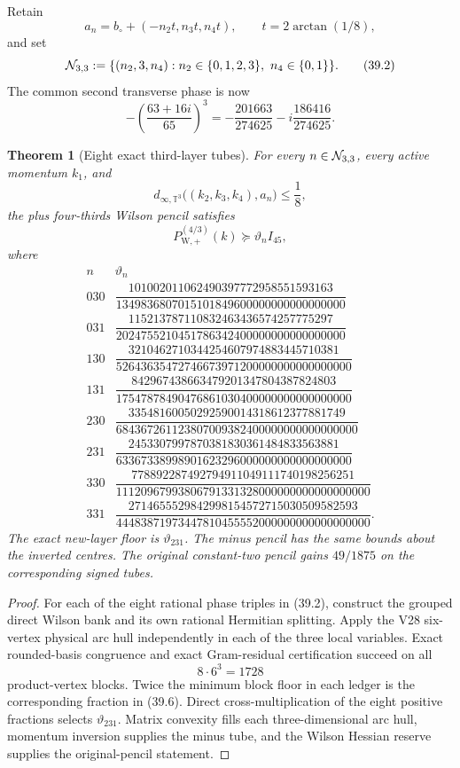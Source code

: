 \documentclass[11pt,oneside]{article}
\newtheorem{theorem}{Theorem}[section]
\theoremstyle{definition}
\theoremstyle{remark}
\begin{document}
Retain
\[
 a_n=b_\circ+(-n_2t,n_3t,n_4t),\qquad
 t=2\arctan(1/8),                                      \tag{39.1}
\]
and set
\[
 {\cal N}_{3,3}:=
 \{(n_2,3,n_4):n_2\in\{0,1,2,3\},\
                   n_4\in\{0,1\}\}.                   \tag{39.2}
\]
The common second transverse phase is now
\[
 -\left(\frac{63+16i}{65}\right)^3
 =-\frac{201663}{274625}
  -i\frac{186416}{274625}.                             \tag{39.3}
\]

\begin{theorem}[Eight exact third-layer tubes]
\label{thm:newv39-eight-charts}
For every \(n\in{\cal N}_{3,3}\), every active momentum \(k_1\), and
\[
 d_{\infty,\mathbb T^3}
 \bigl((k_2,k_3,k_4),a_n\bigr)\le\frac18,              \tag{39.4}
\]
the plus four-thirds Wilson pencil satisfies
\[
 P_{\mathrm W,+}^{(4/3)}(k)\succeq\vartheta_nI_{45},  \tag{39.5}
\]
where
\[
\begin{array}{c|c}
n&\vartheta_n\\ \hline
030&
\dfrac{101002011062490397772958551593163}
{1349836807015101849600000000000000000}\\[6pt]
031&
\dfrac{115213787110832463436574257775297}
{2024755210451786342400000000000000000}\\[6pt]
130&
\dfrac{3210462710344254607974883445710381}
{52643635472746673971200000000000000000}\\[6pt]
131&
\dfrac{842967438663479201347804387824803}
{17547878490476861030400000000000000000}\\[6pt]
230&
\dfrac{33548160050292590014318612377881749}
{684367261123807009382400000000000000000}\\[6pt]
231&
\dfrac{2453307997870381830361484833563881}
{63367338998901623296000000000000000000}\\[6pt]
330&
\dfrac{778892287492794911049111740198256251}
{11120967993806791331328000000000000000000}\\[6pt]
331&
\dfrac{2714655529842998154572715030509582593}
{44483871973447810455552000000000000000000}.
\end{array}                                             \tag{39.6}
\]
The exact new-layer floor is \(\vartheta_{231}\).  The minus pencil
has the same bounds about the inverted centres.  The original
constant-two pencil gains \(49/1875\) on the corresponding signed
tubes.
\end{theorem}

\begin{proof}
For each of the eight rational phase triples in (39.2), construct
the grouped direct Wilson bank and its own rational Hermitian
splitting.  Apply the V28 six-vertex physical arc hull independently
in each of the three local variables.  Exact rounded-basis
congruence and exact Gram-residual certification succeed on all
\[
 8\cdot6^3=1728                                        \tag{39.7}
\]
product-vertex blocks.  Twice the minimum block floor in each
ledger is the corresponding fraction in (39.6).  Direct
cross-multiplication of the eight positive fractions selects
\(\vartheta_{231}\).  Matrix convexity fills each three-dimensional
arc hull, momentum inversion supplies the minus tube, and the
Wilson Hessian reserve supplies the original-pencil statement.
\end{proof}
\end{document}
